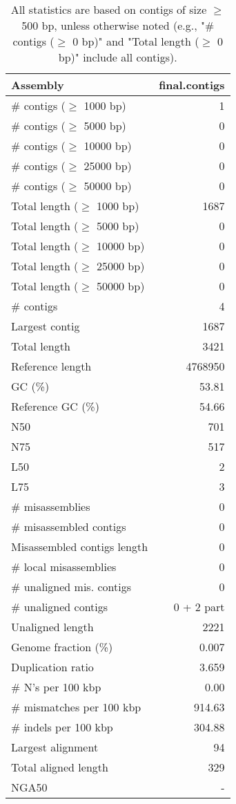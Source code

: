 \documentclass[12pt,a4paper]{article}
\begin{document}
\begin{table}[ht]
\begin{center}
\caption{All statistics are based on contigs of size $\geq$ 500 bp, unless otherwise noted (e.g., "\# contigs ($\geq$ 0 bp)" and "Total length ($\geq$ 0 bp)" include all contigs).}
\begin{tabular}{|l*{1}{|r}|}
\hline
Assembly & final.contigs \\ \hline
\# contigs ($\geq$ 1000 bp) & 1 \\ \hline
\# contigs ($\geq$ 5000 bp) & 0 \\ \hline
\# contigs ($\geq$ 10000 bp) & 0 \\ \hline
\# contigs ($\geq$ 25000 bp) & 0 \\ \hline
\# contigs ($\geq$ 50000 bp) & 0 \\ \hline
Total length ($\geq$ 1000 bp) & 1687 \\ \hline
Total length ($\geq$ 5000 bp) & 0 \\ \hline
Total length ($\geq$ 10000 bp) & 0 \\ \hline
Total length ($\geq$ 25000 bp) & 0 \\ \hline
Total length ($\geq$ 50000 bp) & 0 \\ \hline
\# contigs & 4 \\ \hline
Largest contig & 1687 \\ \hline
Total length & 3421 \\ \hline
Reference length & 4768950 \\ \hline
GC (\%) & 53.81 \\ \hline
Reference GC (\%) & 54.66 \\ \hline
N50 & 701 \\ \hline
N75 & 517 \\ \hline
L50 & 2 \\ \hline
L75 & 3 \\ \hline
\# misassemblies & 0 \\ \hline
\# misassembled contigs & 0 \\ \hline
Misassembled contigs length & 0 \\ \hline
\# local misassemblies & 0 \\ \hline
\# unaligned mis. contigs & 0 \\ \hline
\# unaligned contigs & 0 + 2 part \\ \hline
Unaligned length & 2221 \\ \hline
Genome fraction (\%) & 0.007 \\ \hline
Duplication ratio & 3.659 \\ \hline
\# N's per 100 kbp & 0.00 \\ \hline
\# mismatches per 100 kbp & 914.63 \\ \hline
\# indels per 100 kbp & 304.88 \\ \hline
Largest alignment & 94 \\ \hline
Total aligned length & 329 \\ \hline
NGA50 & - \\ \hline
\end{tabular}
\end{center}
\end{table}
\end{document}
